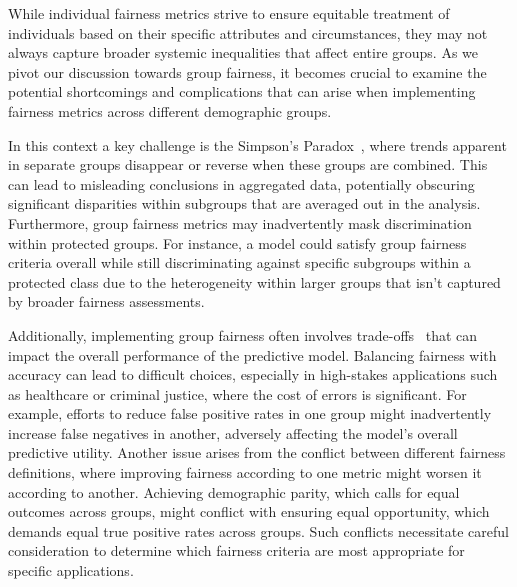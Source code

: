 While individual fairness metrics strive to ensure equitable treatment of individuals based on their specific attributes and circumstances, they may not always capture broader systemic inequalities that affect entire groups. As we pivot our discussion towards group fairness, it becomes crucial to examine the potential shortcomings and complications that can arise when implementing fairness metrics across different demographic groups.

In this context a key challenge is the Simpson's Paradox~\citep{Simpson}, where trends apparent in separate groups disappear or reverse when these groups are combined. This can lead to misleading conclusions in aggregated data, potentially obscuring significant disparities within subgroups that are averaged out in the analysis. Furthermore, group fairness metrics may inadvertently mask discrimination within protected groups. For instance, a model could satisfy group fairness criteria overall while still discriminating against specific subgroups within a protected class due to the heterogeneity within larger groups that isn't captured by broader fairness assessments.

Additionally, implementing group fairness often involves trade-offs~\cite{Goh2016,Komiyama2018,Petrovic2021,Cruz2021,Liu2022} that can impact the overall performance of the predictive model. Balancing fairness with accuracy can lead to difficult choices, especially in high-stakes applications such as healthcare or criminal justice, where the cost of errors is significant. For example, efforts to reduce false positive rates in one group might inadvertently increase false negatives in another, adversely affecting the model's overall predictive utility. Another issue arises from the conflict between different fairness definitions, where improving fairness according to one metric might worsen it according to another. Achieving demographic parity, which calls for equal outcomes across groups, might conflict with ensuring equal opportunity, which demands equal true positive rates across groups. Such conflicts necessitate careful consideration to determine which fairness criteria are most appropriate for specific applications.


